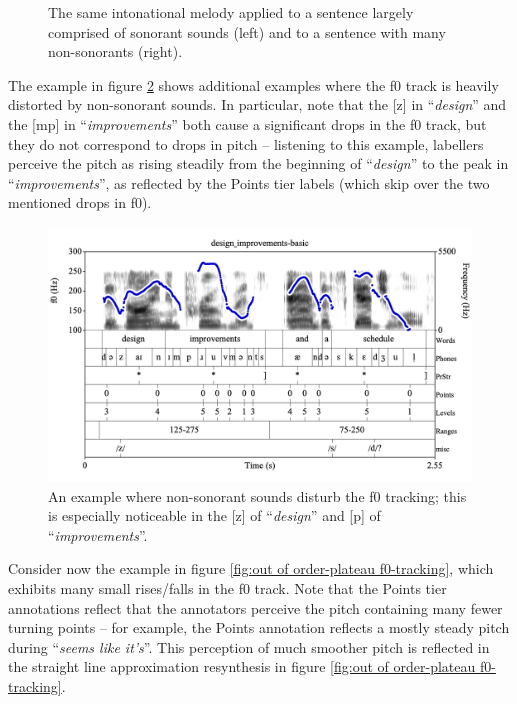 \documentclass[11pt, twoside]{memoir}
\def\langtext#1{\textit{#1}}
\begin{document}
{{{\begin{figure}[H]
\caption{The same intonational melody applied to a sentence largely comprised of sonorant sounds (left) and to a sentence with many non-sonorants (right).
\label{fig:marmalade cake f0-tracking}
}
\end{figure}
The example in figure \ref{fig:design improvements f0-tracking} shows additional examples where the f0 track is heavily distorted by non-sonorant sounds.  In particular, note that the [z] in “\langtext{design}” and the [mp] in “\langtext{improvements}” both cause a significant drops in the f0 track, but they do not correspond to drops in pitch – listening to this example, labellers perceive the pitch as rising steadily from the beginning of “\langtext{design}” to the peak in “\langtext{improvements}”, as reflected by the Points tier labels (which skip over the two mentioned drops in f0).
\begin{figure}[H]
\centering
\includegraphics[width=.875\linewidth]{Appendix-design_improvements.png}
\caption{An example where non-sonorant sounds disturb the f0 tracking; this is especially noticeable in the [z] of “\langtext{design}” and [p] of “\langtext{improvements}”.
\label{fig:design improvements f0-tracking}
}
\end{figure}
Consider now the example in figure \ref{fig:out of order-plateau f0-tracking}, which exhibits many small rises\slash falls in the f0 track. Note that the Points tier annotations reflect that the annotators perceive the pitch containing many fewer turning points – for example, the Points annotation reflects a mostly steady pitch during “\langtext{seems like it’s}”. This perception of much smoother pitch is reflected in the straight line approximation resynthesis in figure \ref{fig:out of order-plateau f0-tracking}.
\begin{figure}[H]

\end{figure}}}}
\end{document}
